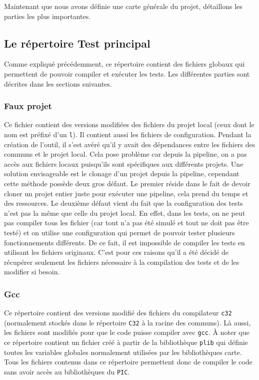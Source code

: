 \documentclass[a4paper]{article}
\begin{document}
Maintenant que nous avons définie une carte générale du projet, détaillons les
parties les plus importantes.

\subsection{Le répertoire Test principal}

Comme expliqué précédemment, ce répertoire contient des fichiers globaux
qui permettent de pouvoir compiler et exécuter les tests. Les différentes
parties sont décrites dans les sections suivantes.

\subsubsection*{Faux projet} %
\label{fakeproj}

Ce fichier contient des versions modifiées des fichiers du projet local (ceux
dont le nom est préfixé d'un \verb|l|). Il contient aussi les fichiers de
configuration. Pendant la création de l'outil, il s'est avéré qu'il y avait des
dépendances entre les fichiers des communs et le projet local. Cela pose
problème car depuis la pipeline, on a pas accès aux fichiers locaux puisqu'ils
sont spécifiques aux différents projets. Une solution envisageable est le
clonage d'un projet depuis la pipeline, cependant cette méthode possède deux
gros défaut. Le premier réside dans le fait de devoir cloner un projet entier
juste pour exécuter une pipeline, cela prend du temps et des ressources. Le
deuxième défaut vient du fait que la configuration des tests n'est pas la même
que celle du projet local. En effet, dans les tests, on ne peut pas compiler
tous les fichier (car tout n'a pas été simulé et tout ne doit pas être testé) et
on utilise une configuration qui permet de pouvoir tester plusieurs
fonctionnements différents. De ce fait, il est impossible de compiler les tests
en utilisant les fichiers originaux. C'est pour ces raisons qu'il a été décidé
de récupérer seulement les fichiers nécessaire à la compilation des tests et de
les modifier si besoin.

\subsubsection*{Gcc}
\label{gcc}

Ce répertoire contient des versions modifié des fichiers du compilateur
\verb|c32| (normalement stockés dans le répertoire \verb|C32| à la racine des
communs). Là aussi, les fichiers sont modifiés pour que le code puisse compiler
avec \verb|gcc|. À noter que ce répertoire contient un fichier créé à partir de
la bibliothèque \verb|plib| qui définie toutes les variables globales
normalement utilisées par les bibliothèques carte. Tous les fichiers contenus
dans ce répertoire permettent donc de compiler le code sans avoir accès au
bibliothèques du \verb|PIC|.
\end{document}
